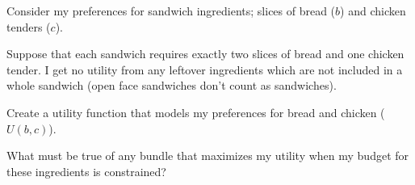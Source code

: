 \begin{question}[type=exam]{8}
  Consider my preferences for sandwich ingredients; slices of bread ($b$) and chicken tenders ($c$).

  Suppose that each sandwich requires exactly two slices of bread and one chicken tender.
  I get no utility from any leftover ingredients which are not included in a whole sandwich
  (open face sandwiches don't count as sandwiches).

  Create a utility function that models my preferences for bread and chicken ($U(b,c)$).

  What must be true of any bundle that maximizes my utility when my budget for these ingredients is constrained?
\end{question}
